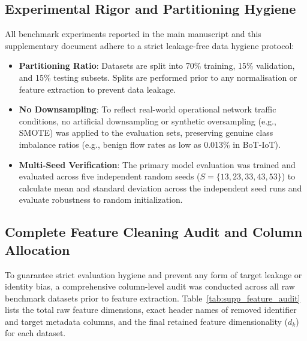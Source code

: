 \documentclass[a4paper,fleqn]{cas-sc}
\begin{document}
\subsection{Experimental Rigor and Partitioning Hygiene}
All benchmark experiments reported in the main manuscript and this supplementary document adhere to a strict leakage-free data hygiene protocol:
\begin{itemize}
    \item \textbf{Partitioning Ratio}: Datasets are split into 70\% training, 15\% validation, and 15\% testing subsets. Splits are performed prior to any normalisation or feature extraction to prevent data leakage.
    \item \textbf{No Downsampling}: To reflect real-world operational network traffic conditions, no artificial downsampling or synthetic oversampling (e.g., SMOTE) was applied to the evaluation sets, preserving genuine class imbalance ratios (e.g., benign flow rates as low as 0.013\% in BoT-IoT).
    \item \textbf{Multi-Seed Verification}: The primary model evaluation was trained and evaluated across five independent random seeds ($S = \{13, 23, 33, 43, 53\}$) to calculate mean and standard deviation across the independent seed runs and evaluate robustness to random initialization.
\end{itemize}

\subsection{Complete Feature Cleaning Audit and Column Allocation}
\label{sec:supp_feature_audit}

To guarantee strict evaluation hygiene and prevent any form of target leakage or identity bias, a comprehensive column-level audit was conducted across all raw benchmark datasets prior to feature extraction. Table~\ref{tab:supp_feature_audit} lists the total raw feature dimensions, exact header names of removed identifier and target metadata columns, and the final retained feature dimensionality ($d_k$) for each dataset.
\end{document}
